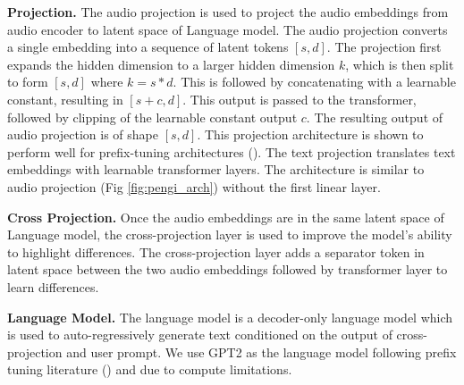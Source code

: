 \noindent \textbf{Projection.} The audio projection is used to project the audio embeddings from audio encoder to latent space of Language model. The audio projection converts a single embedding into a sequence of latent tokens $[s, d]$. The projection first expands the hidden dimension to a larger hidden dimension $k$, which is then split to form $[s, d]$ where $k = s * d$. This is followed by concatenating with a learnable constant, resulting in $[s + c, d]$. This output is passed to the transformer, followed by clipping of the learnable constant output $c$. The resulting output of audio projection is of shape $[s, d]$. This projection architecture is shown to perform well for prefix-tuning architectures (\cite{mspengi, noaudiocap, mokady2021clipcap}). The text projection translates text embeddings with learnable transformer layers. The architecture is similar to audio projection (Fig \ref{fig:pengi_arch}) without the first linear layer. 

\noindent \textbf{Cross Projection.} Once the audio embeddings are in the same latent space of Language model, the cross-projection layer is used to improve the model's ability to highlight differences. The cross-projection layer adds a separator token in latent space between the two audio embeddings followed by transformer layer to learn differences.  

\noindent \textbf{Language Model.} The language model is a decoder-only language model which is used to auto-regressively generate text conditioned on the output of cross-projection and user prompt. We use GPT2 as the language model following prefix tuning literature (\cite{mspengi, noaudiocap, mokady2021clipcap}) and due to compute limitations. 

\vspace{-0.1in}
